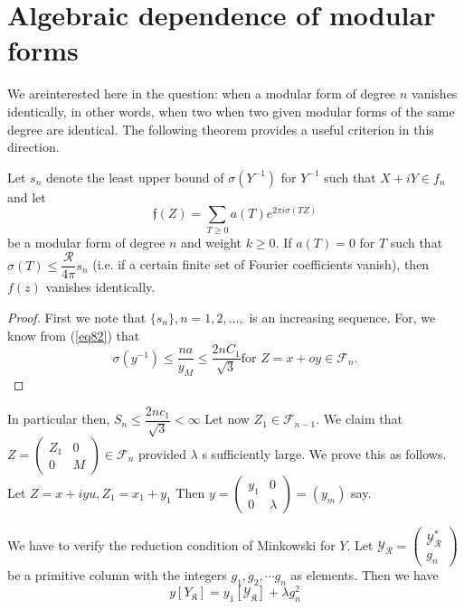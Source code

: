 

\chapter{Algebraic dependence of modular forms}%

We are\pageoriginale interested here in the question: when  a modular form of
degree $n$ vanishes identically, in other words, when two when two
given modular forms  of the same degree are identical. The following
theorem provides a useful criterion in this direction. 

\setcounter{thm}{5}
\begin{thm}\label{chap6:thm6} %
 Let $s_n$ denote the least upper bound of 
$\sigma(Y^{-1})$  for $Y^{-1}$ such that $X + i Y \in
f_n$ and let
$$
\mathfrak{f}(Z)=  \sum_{T  \ge 0} a(T) e^{2 \pi i \sigma(T Z)}
$$
 be a modular form of degree $n$ and weight  $k \ge 0$.  If
$a(T) =0$   for $T$  such that $\sigma(T) \le
\dfrac{\mathscr{R}}{4 \pi} s_n$ (i.e. if a certain finite set of
Fourier coefficients vanish), then $f(z)$ vanishes identically.  
 \end{thm} 

 \begin{proof}
First we note that $\{s_n\}, n=1,2, \ldots ,$ is an increasing
sequence. For, we know from (\ref{eq82}) that  
$$
\sigma(y^{-1}) \le \frac{na}{y_{M}} \le \frac{2n C_1}{\sqrt{3}} \text{
  for } Z=  x+o y \in \mathcal{F}_n . 
$$
 \end{proof} 
 
 In particular then, $S_n \le \dfrac{2nc_1}{\sqrt{3}} < \infty$
 Let now $Z_1 \in \mathcal{F}_{n-1}$. We claim that
 $Z= \begin{pmatrix} Z_1 & 0\\0& M\end{pmatrix}\in \mathcal{F}_n$
   provided $\lambda$ s sufficiently large. We prove this as
   follows. Let  $Z= x+ i yu, Z_1 = x_1+y_1 $ Then
   $y=  \begin{pmatrix} y_1& 0\\0 & \lambda \end{pmatrix} = (y_{m})$
   say. 
 
 We have to verify the reduction condition of Minkowski for $Y$. Let
 $\mathscr{Y}_\mathscr{R}= \begin{pmatrix}\mathscr{Y}^*_\mathscr{R}
   \\ g_n \end{pmatrix}$ be a primitive column with the integers $g_1,
 g_2, \cdots g_n$ as elements.  Then  we have 
 $$
 y[Y_{\mathfrak{K}}]= y_1[\mathscr{Y}_{\mathfrak{K}}] + \lambda g^2_n
 $$\pageoriginale
 

